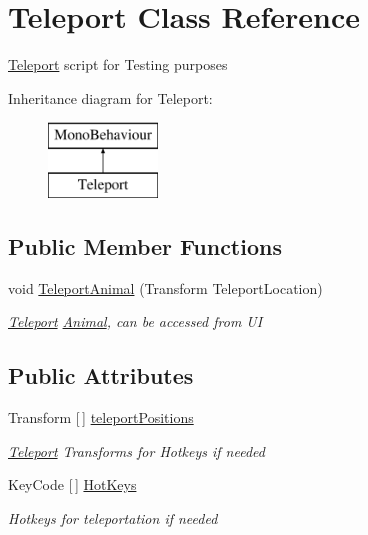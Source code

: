 \hypertarget{class_teleport}{}\section{Teleport Class Reference}
\label{class_teleport}


\mbox{\hyperlink{class_teleport}{Teleport}} script for Testing purposes  


Inheritance diagram for Teleport\+:\begin{figure}[H]
\begin{center}
\leavevmode
\includegraphics[height=2.000000cm]{class_teleport}
\end{center}
\end{figure}
\subsection*{Public Member Functions}
\begin{DoxyCompactItemize}
\item 
void \mbox{\hyperlink{class_teleport_ae61fbbaee5a688ae7d68fd92f5a91081}{Teleport\+Animal}} (Transform Teleport\+Location)
\begin{DoxyCompactList}\small\item\em \mbox{\hyperlink{class_teleport}{Teleport}} \mbox{\hyperlink{class_animal}{Animal}}, can be accessed from UI \end{DoxyCompactList}\end{DoxyCompactItemize}
\subsection*{Public Attributes}
\begin{DoxyCompactItemize}
\item 
Transform \mbox{[}$\,$\mbox{]} \mbox{\hyperlink{class_teleport_a4225fffa27befd1f527d6fa4e6133dec}{teleport\+Positions}}
\begin{DoxyCompactList}\small\item\em \mbox{\hyperlink{class_teleport}{Teleport}} Transforms for Hotkeys if needed \end{DoxyCompactList}\item 
Key\+Code \mbox{[}$\,$\mbox{]} \mbox{\hyperlink{class_teleport_a6e17daf152d465ccbb1e7524f0d0ab57}{Hot\+Keys}}
\begin{DoxyCompactList}\small\item\em Hotkeys for teleportation if needed \end{DoxyCompactList}\end{DoxyCompactItemize}


